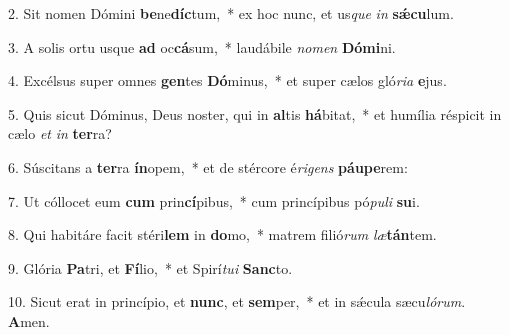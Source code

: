 2. Sit nomen Dómini \textbf{be}ne\textbf{díc}tum,~*  ex hoc nunc, et us\textit{que} \textit{in} \textbf{sǽ}\textbf{cu}lum.\

3. A solis ortu usque \textbf{ad} oc\textbf{cá}sum,~*  laudábile \textit{no}\textit{men} \textbf{Dó}\textbf{mi}ni.\

4. Excélsus super omnes \textbf{gen}tes \textbf{Dó}minus,~*  et super cælos gló\textit{ri}\textit{a} \textbf{e}jus.\

5. Quis sicut Dóminus, Deus noster, qui in \textbf{al}tis \textbf{há}bitat,~*  et humília réspicit in cælo \textit{et} \textit{in} \textbf{ter}ra?\

6. Súscitans a \textbf{ter}ra \textbf{ín}opem,~*  et de stércore é\textit{ri}\textit{gens} \textbf{páu}\textbf{pe}rem:\

7. Ut cóllocet eum \textbf{cum} prin\textbf{cí}pibus,~*  cum princípibus pó\textit{pu}\textit{li} \textbf{su}i.\

8. Qui habitáre facit stéri\textbf{lem} in \textbf{do}mo,~*  matrem filió\textit{rum} \textit{læ}\textbf{tán}tem.\

9. Glória \textbf{Pa}tri, et \textbf{Fí}lio,~*  et Spirí\textit{tu}\textit{i} \textbf{Sanc}to.\

10. Sicut erat in princípio, et \textbf{nunc}, et \textbf{sem}per,~*  et in sǽcula sæcu\textit{ló}\textit{rum}. \textbf{A}men.\


